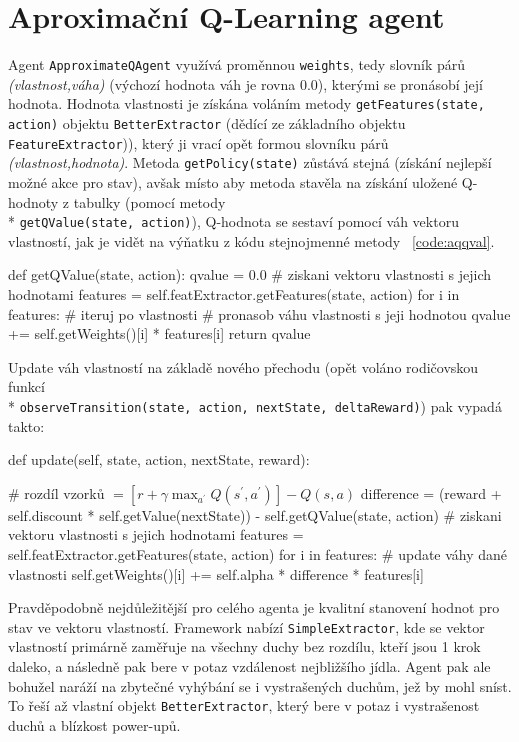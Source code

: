 \section{Aproximační Q-Learning agent}
Agent \texttt{ApproximateQAgent} využívá proměnnou \texttt{weights}, tedy slovník párů \textit{(vlastnost,váha)} (výchozí hodnota váh je rovna $0.0$), kterými se pronásobí její hodnota. Hodnota vlastnosti je získána voláním metody \texttt{getFeatures(state, action)} objektu \texttt{BetterExtractor} (dědící ze základního objektu \texttt{FeatureExtractor})), který ji vrací opět formou slovníku párů \textit{(vlastnost,hodnota)}. Metoda \texttt{getPolicy(state)} zůstává stejná (získání nejlepší možné akce pro stav), avšak místo aby metoda stavěla na získání uložené Q-hodnoty z tabulky (pomocí metody \\* \texttt{getQValue(state, action)}), Q-hodnota se sestaví pomocí váh vektoru vlastností, jak je vidět na výňatku z kódu stejnojmenné metody ~\ref{code:aqqval}.
\begin{python}[label={code:aqqval}]
def getQValue(state, action):
   qvalue = 0.0
   # ziskani vektoru vlastnosti s jejich hodnotami
   features = self.featExtractor.getFeatures(state, action)
   for i in features: # iteruj po vlastnosti
      # pronasob váhu vlastnosti s jeji hodnotou
      qvalue += self.getWeights()[i] * features[i]
   return qvalue
\end{python}
Update váh vlastností na základě nového přechodu (opět voláno rodičovskou funkcí \\* \texttt{observeTransition(state, action, nextState, deltaReward)}) pak vypadá takto:
\begin{python}
def update(self, state, action, nextState, reward):

   # rozdíl vzorků $= \left [ r + \gamma \max_{a^\prime}Q(s^\prime,a^\prime) \right] - Q(s,a)  $
   difference = (reward + self.discount * self.getValue(nextState)) 
                - self.getQValue(state, action)
   # ziskani vektoru vlastnosti s jejich hodnotami
   features = self.featExtractor.getFeatures(state, action)
   for i in features:
      # update váhy dané vlastnosti
      self.getWeights()[i] += self.alpha * difference * features[i]
\end{python}

Pravděpodobně nejdůležitější pro celého agenta je kvalitní stanovení hodnot pro stav ve vektoru vlastností. Framework nabízí \texttt{SimpleExtractor}, kde se vektor vlastností primárně zaměřuje na všechny duchy bez rozdílu, kteří jsou 1 krok daleko, a následně pak bere v potaz vzdálenost nejbližšího jídla. Agent pak ale bohužel naráží na zbytečné vyhýbání se i vystrašených duchům, jež by mohl sníst. To řeší až vlastní objekt \texttt{BetterExtractor}, který bere v potaz i vystrašenost duchů a blízkost power-upů.

